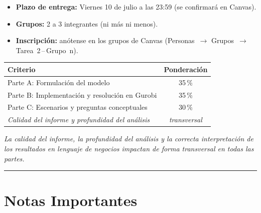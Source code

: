 \documentclass[12pt,a4paper]{article}
\begin{document}
\begin{itemize}[topsep=2pt]
    \item \textbf{Plazo de entrega:} Viernes 10 de julio a las 23:59
          (se confirmará en Canvas).
    \item \textbf{Grupos:} 2 a 3 integrantes (ni más ni menos).
    \item \textbf{Inscripción:} anótense en los grupos de Canvas
          (Personas~$\to$ Grupos~$\to$ Tarea~2\,--\,Grupo~n).
\end{itemize}

\vspace{0.5em}

\begin{center}
\renewcommand{\arraystretch}{1.2}
\begin{tabular}{lc}
\toprule
\textbf{Criterio} & \textbf{Ponderación} \\
\midrule
Parte A: Formulación del modelo                      & 35\,\% \\
Parte B: Implementación y resolución en Gurobi       & 35\,\% \\
Parte C: Escenarios y preguntas conceptuales         & 30\,\% \\
\midrule
\textit{Calidad del informe y profundidad del análisis} &
\textit{transversal} \\
\bottomrule
\end{tabular}
\end{center}

\vspace{0.3em}
\noindent\textit{La calidad del informe, la profundidad del análisis y la
correcta interpretación de los resultados en lenguaje de negocios impactan
de forma transversal en todas las partes.}

\noindent\rule{\linewidth}{0.4pt}

\section*{Notas Importantes}
\end{document}
